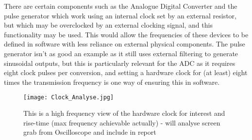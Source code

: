 \documentclass[../main.tex]{subfiles}
\begin{document}
There are certain components such as the Analogue Digital Converter and the pulse generator which work using an internal clock set by an external resistor, but which may be overclocked by an external clocking signal, and this functionality may be used.
This would allow the frequencies of these devices to be defined in software with less reliance on external physical components.
The pulse generator isn't as good an example as it still uses external filtering to generate sinusoidal outputs, but this is particularly relevant for the ADC as it requires eight clock pulses per conversion, and setting a hardware clock for (at least) eight times the transmission frequency is one way of ensuring this in software.\\

\begin{figure}[ht]
	\centering
	\texttt{[image: Clock\_Analyse.jpg]}
	\caption{This is a high frequency view of the hardware clock for interest and rise-time (max frequency achievable actually) - will analyse screen grab from Oscilloscope and include in report}
\end{figure}
\end{document}
